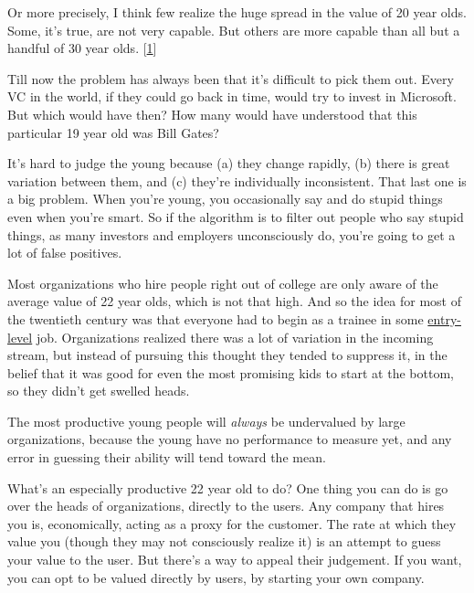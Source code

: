 Or more precisely, I think few
                    realize the huge spread in the value of 20 year olds. Some,
                    it's true, are not very capable. But others are more capable
                    than all but a handful of 30 year olds.
                    [\href{\#f1n}{1}]

Till now the problem has always been that it's
                    difficult to pick them out. Every VC in the world, if they
                    could go back in time, would try to invest in Microsoft. But
                    which would have then? How many would have understood that
                    this particular 19 year old was Bill Gates?

It's
                    hard to judge the young because (a) they change rapidly, (b)
                    there is great variation between them, and (c) they're
                    individually inconsistent. That last one is a big problem.
                    When you're young, you occasionally say and do stupid things
                    even when you're smart. So if the algorithm is to filter out
                    people who say stupid things, as many investors and
                    employers unconsciously do, you're going to get a lot of
                    false positives.

Most organizations who hire
                    people right out of college are only aware of the average
                    value of 22 year olds, which is not that high. And so the
                    idea for most of the twentieth century was that everyone had
                    to begin as a trainee in some
                    \href{http://slashdot.org/comments.pl?sid=158756\&cid=13299057}{entry-level}
                    job. Organizations realized there was a lot of variation in
                    the incoming stream, but instead of pursuing this thought
                    they tended to suppress it, in the belief that it was good
                    for even the most promising kids to start at the bottom, so
                    they didn't get swelled heads.

The most
                    productive young people will \emph{always} be undervalued by
                    large organizations, because the young have no performance
                    to measure yet, and any error in guessing their ability will
                    tend toward the mean.

What's an especially
                    productive 22 year old to do? One thing you can do is go
                    over the heads of organizations, directly to the users. Any
                    company that hires you is, economically, acting as a proxy
                    for the customer. The rate at which they value you (though
                    they may not consciously realize it) is an attempt to guess
                    your value to the user. But there's a way to appeal their
                    judgement. If you want, you can opt to be valued directly by
                    users, by starting your own company.

